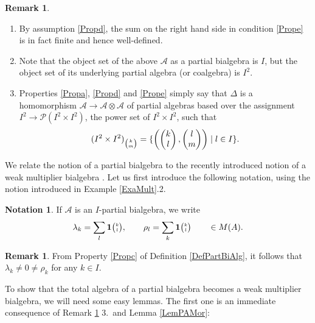 \documentclass[10pt]{article}
\newcommand{\Grt}[3]{#1{\tiny{\begin{pmatrix} #2\\#3\end{pmatrix}}}}
\newcommand{\UnitC}[2]{\Grt{\mathbf{1}}{#1}{#2}}
\theoremstyle{definition}
\newtheorem{Rem}[Theorem]{Remark}
\newtheorem{Not}[Theorem]{Notation}
\numberwithin{equation}{section}
\begin{document}
\begin{Rem}\label{RemBA}\begin{enumerate}
\item By assumption \ref{Propd}, the sum on the right hand side in condition \ref{Prope} is in fact finite and hence well-defined. 
\item Note that the object set of the above $\mathscr{A}$ as a partial bialgebra is $I$, but the object set of its underlying partial algebra (or coalgebra) is $I^2$.
\item Properties \ref{Propa}, \ref{Propd} and \ref{Prope} simply say that $\Delta$ is a homomorphism $\mathscr{A}\rightarrow \mathscr{A}\otimes \mathscr{A}$ of partial algebras based over the assignment $I^2\rightarrow \mathscr{P}(I^2\times I^2)$, the power set of $I^2\times I^2$, such that \[(I^2\times I^2)_{{\tiny \begin{pmatrix} k\\m \end{pmatrix}}} = \{\left(\begin{pmatrix} k \\ l \end{pmatrix},\begin{pmatrix} l \\ m \end{pmatrix}\right)\mid l\in I\}.\] 
\end{enumerate}
\end{Rem}

We relate the notion of a partial bialgebra to the recently introduced
notion of a weak multiplier bialgebra \cite{Boh1}. Let us first introduce the following notation, using the notion introduced in Example \ref{ExaMult}.2.

\begin{Not}
If $\mathscr{A}$ is an $I$-partial bialgebra, we write \[\lambda_k = \sum_l \UnitC{k}{l},\qquad \rho_l = \sum_k\UnitC{k}{l} \qquad \in M(A).\]
\end{Not}

\begin{Rem} From Property \ref{Propc} of Definition \ref{DefPartBiAlg}, it follows that $\lambda_k\neq 0\neq \rho_k$ for any $k\in I$. 
\end{Rem} 

To show that the total algebra of a partial bialgebra becomes a weak
multiplier bialgebra, we will need some easy lemmas. The first one is
an immediate consequence of Remark \ref{RemBA} 3.\ and Lemma \ref{LemPAMor}:
\end{document}
